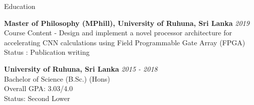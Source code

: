 \documentclass[
	11pt, %
]{./../assets/resume} %
\begin{document}
\begin{rSection}{Education}

	\textbf{Master of Philosophy (MPhill), University of Ruhuna, Sri Lanka} \hfill \textit{2019} \\ 
	Course Content - Design and implement a novel processor architecture for accelerating CNN calculations using Field Programmable Gate Array (FPGA) \\
	Status : Publication writing

	\textbf{University of Ruhuna, Sri Lanka} \hfill \textit{2015 - 2018} \\ 
	Bachelor of Science (B.Sc.) (Hons)\\
	Overall GPA: 3.03/4.0 \\
	Status: Second Lower
	
\end{rSection}

\end{document}

